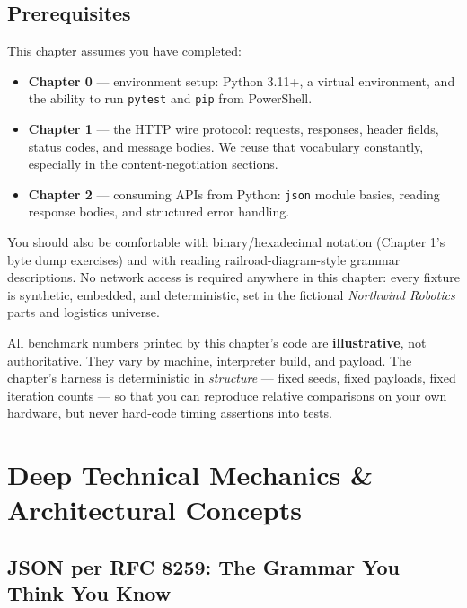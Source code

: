 \subsection*{Prerequisites}
This chapter assumes you have completed:

\begin{itemize}
  \item \textbf{Chapter 0} --- environment setup: Python 3.11+, a virtual environment,
        and the ability to run \texttt{pytest} and \texttt{pip} from PowerShell.
  \item \textbf{Chapter 1} --- the HTTP wire protocol: requests, responses, header
        fields, status codes, and message bodies. We reuse that vocabulary constantly,
        especially in the content-negotiation sections.
  \item \textbf{Chapter 2} --- consuming APIs from Python: \texttt{json} module
        basics, reading response bodies, and structured error handling.
\end{itemize}

You should also be comfortable with binary/hexadecimal notation (Chapter 1's byte
dump exercises) and with reading railroad-diagram-style grammar descriptions. No
network access is required anywhere in this chapter: every fixture is synthetic,
embedded, and deterministic, set in the fictional \emph{Northwind Robotics} parts
and logistics universe.

\begin{warningbox}
All benchmark numbers printed by this chapter's code are \textbf{illustrative}, not
authoritative. They vary by machine, interpreter build, and payload. The chapter's
harness is deterministic in \emph{structure} --- fixed seeds, fixed payloads, fixed
iteration counts --- so that you can reproduce relative comparisons on your own
hardware, but never hard-code timing assertions into tests.
\end{warningbox}

\section{Deep Technical Mechanics \& Architectural Concepts}
\label{sec:ch4-mechanics}

\subsection{JSON per RFC 8259: The Grammar You Think You Know}
\label{sec:ch4-json}

